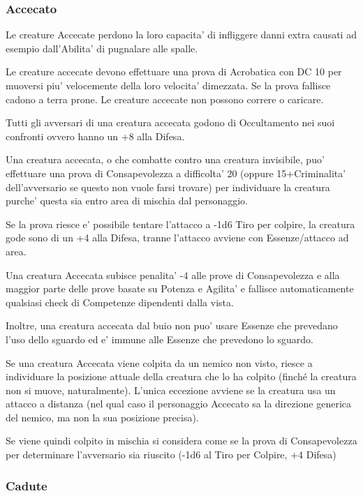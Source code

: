 \documentclass[a4paper,11pt,twoside,openany]{book}
\begin{document}
{		\subsubsection{Accecato}
		
		\label{accecato}
		
		Le creature Accecate perdono la loro capacita' di infliggere danni extra causati ad esempio dall'Abilita' di pugnalare alle spalle.
		
		Le creature accecate devono effettuare una prova di Acrobatica con DC 10 per muoversi piu' velocemente della loro velocita' dimezzata. Se la prova fallisce cadono a terra prone. Le creature accecate non possono correre o caricare.
		
		Tutti gli avversari di una creatura accecata godono di Occultamento nei suoi confronti ovvero hanno un +8 alla Difesa.
		
		Una creatura accecata, o che combatte contro una creatura invisibile, puo' effettuare una prova di Consapevolezza a difficolta' 20 (oppure 15+Criminalita' dell'avversario se questo non vuole farsi trovare) per individuare la creatura purche' questa sia entro area di mischia dal personaggio.
		
		Se la prova riesce e' possibile tentare l'attacco a -1d6 Tiro per colpire, la creatura gode sono di un +4 alla Difesa, tranne l'attacco avviene con Essenze/attacco ad area.
		
		Una creatura Accecata subisce penalita' -4 alle prove di Consapevolezza e alla maggior parte delle prove basate su Potenza e Agilita' e fallisce automaticamente qualsiasi check di Competenze dipendenti dalla vista. 
		
		Inoltre, una creatura accecata dal buio non puo' usare Essenze che prevedano l'uso dello sguardo ed e' immune alle Essenze che prevedono lo sguardo.
		
		Se una creatura Accecata viene colpita da un nemico non visto, riesce a individuare la posizione attuale della creatura che lo ha colpito (finché la creatura non si muove, naturalmente). L'unica eccezione avviene se la creatura usa un attacco a distanza (nel qual caso il personaggio Accecato sa la direzione generica del nemico, ma non la sua posizione precisa).
		
		Se viene quindi colpito in mischia si considera come se la prova di Consapevolezza per determinare l'avversario sia riuscito (-1d6 al Tiro per Colpire, +4 Difesa)
		
		\subsubsection{Cadute}
		
}
\end{document}
